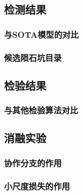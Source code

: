 \subsection{检测结果}
\subsubsection{与SOTA模型的对比}

\subsubsection{候选陨石坑目录}

\subsection{检验结果}
\subsubsection{与其他检验算法对比}

\subsection{消融实验}
\subsubsection{协作分支的作用}
\subsubsection{小尺度损失的作用}

